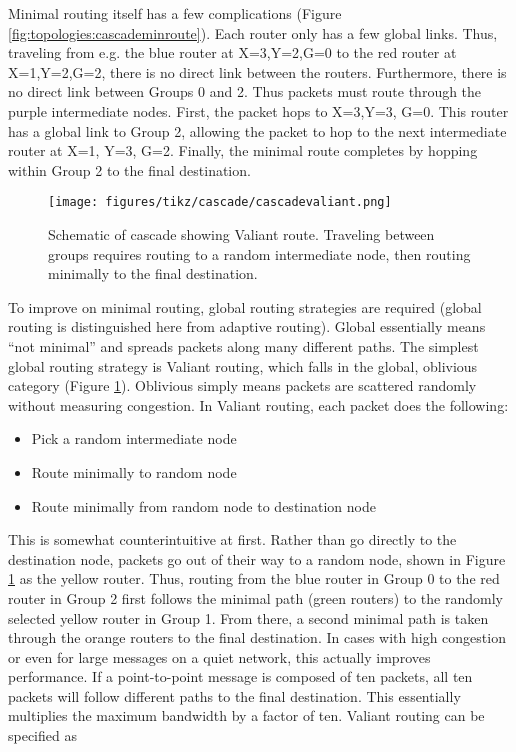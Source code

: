 Minimal routing itself has a few complications (Figure \ref{fig:topologies:cascademinroute}).
Each router only has a few global links.
Thus, traveling from e.g. the blue router at X=3,Y=2,G=0 to the red router at X=1,Y=2,G=2, there is no direct link between the routers.
Furthermore, there is no direct link between Groups 0 and 2.
Thus packets must route through the purple intermediate nodes.
First, the packet hops to X=3,Y=3, G=0.
This router has a global link to Group 2, allowing the packet to hop to the next intermediate router at X=1, Y=3, G=2.
Finally, the minimal route completes by hopping within Group 2 to the final destination.

\begin{figure}[h!]
\centering
\texttt{[image: figures/tikz/cascade/cascadevaliant.png]}
\caption{Schematic of cascade showing Valiant route. Traveling between groups requires routing to a random intermediate node, then routing minimally to the final destination.}
\label{fig:topologies:cascadevaliantroute}
\end{figure}

To improve on minimal routing, global routing strategies are required (global routing is distinguished here from adaptive routing).  
Global essentially means ``not minimal'' and spreads packets along many different paths.
The simplest global routing strategy is Valiant routing, which falls in the global, oblivious category (Figure \ref{fig:topologies:cascadevaliantroute}).
Oblivious simply means packets are scattered randomly without measuring congestion.
In Valiant routing, each packet does the following:
\begin{itemize}
\item Pick a random intermediate node 
\item Route minimally to random node
\item Route minimally from random node to destination node
\end{itemize}
This is somewhat counterintuitive at first.
Rather than go directly to the destination node, packets go out of their way to a random node, shown in Figure \ref{fig:topologies:cascadevaliantroute} as the yellow router.
Thus, routing from the blue router in Group 0 to the red router in Group 2 first follows the minimal path (green routers) to the randomly selected yellow router in Group 1. 
From there, a second minimal path is taken through the orange routers to the final destination.
In cases with high congestion or even for large messages on a quiet network, this actually improves performance.
If a point-to-point message is composed of ten packets,
all ten packets will follow different paths to the final destination.
This essentially multiplies the maximum bandwidth by a factor of ten.
Valiant routing can be specified as


